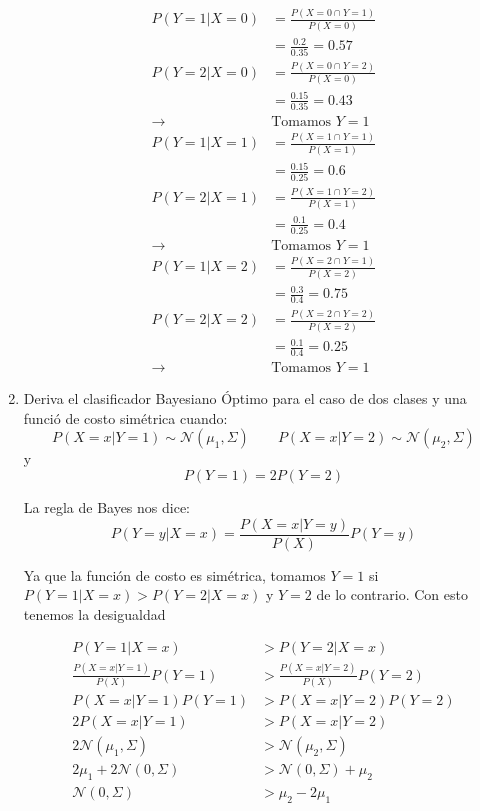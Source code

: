 \documentclass{article}
\begin{document}
\begin{enumerate}
\begin{multicols}{3}
\small
  \begin{align*}
    P(Y = 1 | X = 0) &= \frac{P( X = 0 \cap Y = 1)}{P(X = 0)}\\
                     &= \frac{0.2}{0.35} = 0.57\\
    P(Y = 2 | X = 0) &= \frac{P( X = 0 \cap Y = 2)}{P(X = 0)}\\
                     &= \frac{0.15}{0.35} = 0.43\\
         \rightarrow & \text{Tomamos } Y = 1
  \end{align*}\break
  \begin{align*}
    P(Y = 1 | X = 1) &= \frac{P( X = 1 \cap Y = 1)}{P(X = 1)}\\
                     &= \frac{0.15}{0.25} = 0.6\\
    P(Y = 2 | X = 1) &= \frac{P( X = 1 \cap Y = 2)}{P(X = 1)}\\
                     &= \frac{0.1}{0.25} = 0.4\\
         \rightarrow & \text{Tomamos } Y = 1
  \end{align*}\break
  \begin{align*}
    P(Y = 1 | X = 2) &= \frac{P( X = 2 \cap Y = 1)}{P(X = 2)}\\
                     &= \frac{0.3}{0.4} = 0.75\\
    P(Y = 2 | X = 2) &= \frac{P( X = 2 \cap Y = 2)}{P(X = 2)}\\
                     &= \frac{0.1}{0.4} = 0.25\\
         \rightarrow & \text{Tomamos } Y = 1
  \end{align*}
\end{multicols}

\item Deriva el clasificador Bayesiano Óptimo para el caso de dos clases y una funció de costo simétrica cuando:
  $$ P(X = x|Y = 1) \sim \mathcal{N}(\mu_1, \Sigma) \qquad P(X = x|Y = 2) \sim \mathcal{N}(\mu_2, \Sigma) $$
y
  $$ P(Y = 1) = 2 P(Y = 2)$$

La regla de Bayes nos dice:
  $$P(Y = y | X = x) = \frac{P(X = x | Y = y)}{P(X)}P(Y = y)$$

Ya que la función de costo es simétrica, tomamos $Y = 1$ si $P(Y = 1 | X = x) > P(Y = 2 | X = x)$ y $Y = 2$ de lo contrario. Con esto tenemos la desigualdad

  \begin{align}
    P(Y = 1 | X = x)                      &> P(Y = 2 | X = x)\\
    \frac{P(X = x | Y = 1)}{P(X)}P(Y = 1) &> \frac{P(X = x | Y = 2)}{P(X)}P(Y = 2)\\
    P(X = x | Y = 1)P(Y = 1)              &> P(X = x | Y = 2)P(Y = 2)\\
    2P(X = x | Y = 1)                     &> P(X = x | Y = 2)\\
    2 \mathcal{N}(\mu_1, \Sigma)          &> \mathcal{N}(\mu_2, \Sigma)\\
    2\mu_1 + 2\mathcal{N}(0, \Sigma)      &> \mathcal{N}(0, \Sigma) + \mu_2\\
    \mathcal{N}(0, \Sigma)                &> \mu_2 - 2\mu_1
  \end{align}


\end{enumerate}
\end{document}
